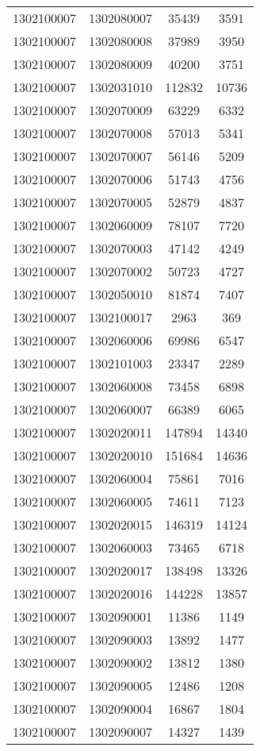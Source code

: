 \begin{longtable}{llcc}
1302100007 & 1302080007 & 35439 & 3591\\
1302100007 & 1302080008 & 37989 & 3950\\
1302100007 & 1302080009 & 40200 & 3751\\
1302100007 & 1302031010 & 112832 & 10736\\
1302100007 & 1302070009 & 63229 & 6332\\
1302100007 & 1302070008 & 57013 & 5341\\
1302100007 & 1302070007 & 56146 & 5209\\
1302100007 & 1302070006 & 51743 & 4756\\
1302100007 & 1302070005 & 52879 & 4837\\
1302100007 & 1302060009 & 78107 & 7720\\
1302100007 & 1302070003 & 47142 & 4249\\
1302100007 & 1302070002 & 50723 & 4727\\
1302100007 & 1302050010 & 81874 & 7407\\
1302100007 & 1302100017 & 2963 & 369\\
1302100007 & 1302060006 & 69986 & 6547\\
1302100007 & 1302101003 & 23347 & 2289\\
1302100007 & 1302060008 & 73458 & 6898\\
1302100007 & 1302060007 & 66389 & 6065\\
1302100007 & 1302020011 & 147894 & 14340\\
1302100007 & 1302020010 & 151684 & 14636\\
1302100007 & 1302060004 & 75861 & 7016\\
1302100007 & 1302060005 & 74611 & 7123\\
1302100007 & 1302020015 & 146319 & 14124\\
1302100007 & 1302060003 & 73465 & 6718\\
1302100007 & 1302020017 & 138498 & 13326\\
1302100007 & 1302020016 & 144228 & 13857\\
1302100007 & 1302090001 & 11386 & 1149\\
1302100007 & 1302090003 & 13892 & 1477\\
1302100007 & 1302090002 & 13812 & 1380\\
1302100007 & 1302090005 & 12486 & 1208\\
1302100007 & 1302090004 & 16867 & 1804\\
1302100007 & 1302090007 & 14327 & 1439\\

\end{longtable}

